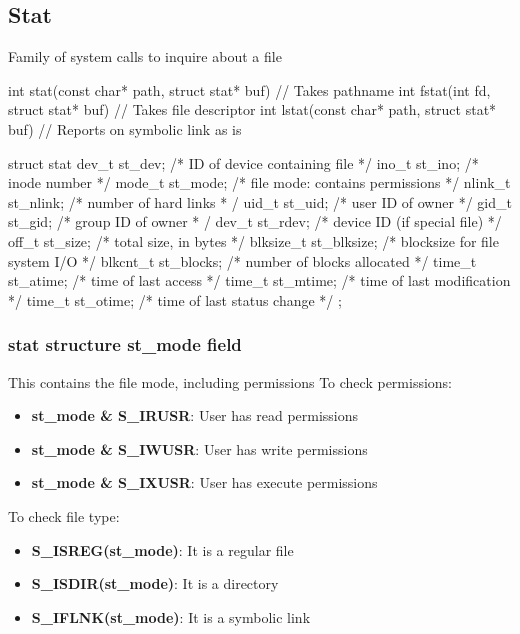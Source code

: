 \documentclass{report}
\begin{document}
    \bigbreak \noindent 
    \subsection{Stat}
    \begin{concept}
        Family of system calls to inquire about a file
    \end{concept}
    \bigbreak \noindent 
    \begin{cppcode}
    int stat(const char* path, struct stat* buf) // Takes pathname
    int fstat(int fd, struct stat* buf) // Takes file descriptor
    int lstat(const char* path, struct stat* buf) // Reports on symbolic link as is
    \end{cppcode}
    \bigbreak \noindent 
    \begin{cppcode}
        struct stat  {
            dev_t       st_dev;         /* ID of device containing file */ 
            ino_t       st_ino;         /* inode number */ 
            mode_t      st_mode;        /* file mode: contains permissions */ 
            nlink_t     st_nlink;       /* number of hard links  * /
            uid_t       st_uid;         /* user ID of owner */ 
            gid_t       st_gid;         /* group ID of owner  * /
            dev_t       st_rdev;        /* device ID (if special file) */ 
            off_t       st_size;        /* total size, in bytes */ 
            blksize_t   st_blksize;     /* blocksize for file system I/O */ 
            blkcnt_t    st_blocks;      /* number of blocks allocated */ 
            time_t      st_atime;       /* time of last access */ 
            time_t      st_mtime;       /* time of last modification */
            time_t      st_otime;       /* time of last status change */ 
        };
        \end{cppcode}

        \bigbreak \noindent 
        \subsubsection{stat structure st\_mode field}
        \bigbreak \noindent 
        This contains the file mode, including permissions
        \bigbreak \noindent 
        To check permissions:
        \begin{itemize}
            \item \textbf{st\_mode \& S\_IRUSR}: User has read permissions
            \item \textbf{st\_mode \& S\_IWUSR}: User has write permissions
            \item \textbf{st\_mode \& S\_IXUSR}: User has execute permissions
        \end{itemize}
        \bigbreak \noindent 
        To check file type:
        \begin{itemize}
            \item \textbf{S\_ISREG(st\_mode)}: It is a regular file
            \item \textbf{S\_ISDIR(st\_mode)}: It is a directory
            \item \textbf{S\_IFLNK(st\_mode)}: It is a symbolic link
        \end{itemize}
\end{document}
